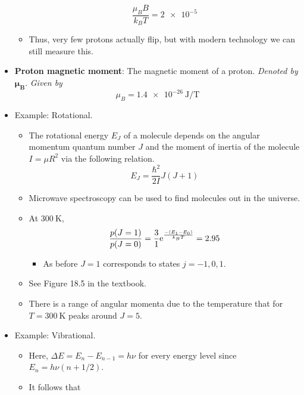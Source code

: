 \documentclass[../notes.tex]{subfiles}
\begin{document}
\begin{itemize}
\begin{itemize}
        \begin{equation*}
            \frac{\mu_BB}{k_BT} = \num{2e-5}
        \end{equation*}
        \item Thus, very few protons actually flip, but with modern technology we can still measure this.
    \end{itemize}
    \item \textbf{Proton magnetic moment}: The magnetic moment of a proton. \emph{Denoted by} $\bm{\mu_B}$. \emph{Given by}
    \begin{equation*}
        \mu_B = \SI[per-mode=symbol]{1.4e-26}{\joule\per\tesla}
    \end{equation*}
    \item Example: Rotational.
    \begin{itemize}
        \item The rotational energy $E_J$ of a molecule depends on the angular momentum quantum number $J$ and the moment of inertia of the molecule $I=\mu R^2$ via the following relation.
        \begin{equation*}
            E_J = \frac{\hbar^2}{2I}J(J+1)
        \end{equation*}
        \item Microwave spectroscopy can be used to find molecules out in the universe.
        \item At $\SI{300}{\kelvin}$,
        \begin{equation*}
            \frac{p(J=1)}{p(J=0)} = \frac{3}{1}\e[\frac{-(E_1-E_0)}{k_BT}] = 2.95
        \end{equation*}
        \begin{itemize}
            \item As before $J=1$ corresponds to states $j=-1,0,1$.
        \end{itemize}
        \item See Figure 18.5 in the textbook.
        \item There is a range of angular momenta due to the temperature that for $T=\SI{300}{\kelvin}$ peaks around $J=5$.
    \end{itemize}
    \item Example: Vibrational.
    \begin{itemize}
        \item Here, $\Delta E=E_n-E_{n-1}=h\nu$ for every energy level since $E_n=h\nu(n+1/2)$.
        \item It follows that
        \begin{equation*}

\end{equation*}
\end{itemize}
\end{itemize}
\end{document}

